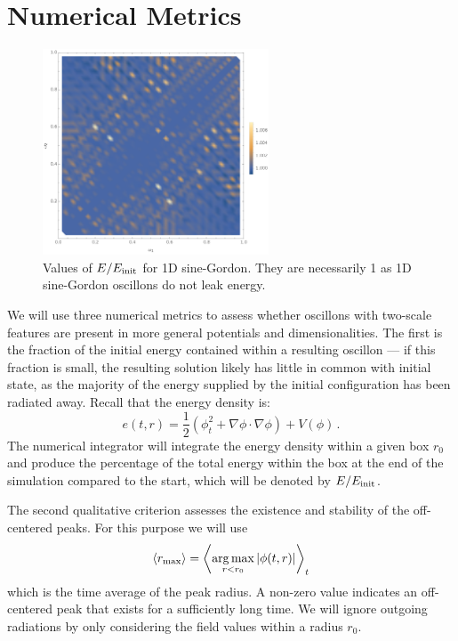 \documentclass{report}
\DeclareMathOperator*{\argmax}{arg\,max}
\begin{document}
\section{Numerical Metrics}\label{numerical}
\begin{figure}
  \centering
  \includegraphics[width=0.6\textwidth]{plot/energy-ratio-sine-1d.pdf}
  \caption{Values of $E/E_{\rm init}$ for 1D sine-Gordon. They are necessarily 1 as 1D sine-Gordon oscillons do not leak energy.}\label{sine1denergy}
\end{figure}

We will use three numerical metrics to assess whether oscillons with two-scale features are present in more general potentials and dimensionalities.  The first is the fraction of the initial energy contained within a resulting oscillon --- if this fraction is small,  the resulting solution likely has little in common with initial state, as the majority of the energy supplied by the initial configuration has  been radiated away. Recall that the energy density is:
\begin{equation}
  e(t,r) = \frac{1}{2}\left(\phi_t^2+ \nabla \phi\cdot \nabla \phi \right) + V(\phi) \, .
\end{equation}
The numerical integrator will integrate the energy density within a given box $r_0$ and produce the percentage of the total energy within the box at the end of the simulation compared to the start, which will be denoted by $E/E_{\rm init}$.

The second qualitative criterion assesses the existence and stability of the off-centered peaks. For this purpose we will use
\begin{equation}
  \langle r_{\rm max} \rangle  = \left\langle \argmax_{r < r_0} |\phi(t,r)| \right\rangle_t
\end{equation}
which is the time average of the peak radius. A non-zero value indicates an off-centered peak that exists for a sufficiently long time. We will ignore outgoing radiations by only considering the field values within a radius $r_0$.
\end{document}
